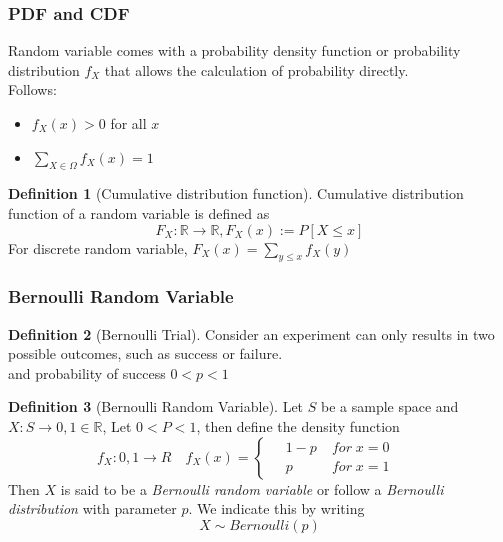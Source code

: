 \documentclass{article}
\theoremstyle{definition}
\newtheorem{definition}{Definition}[subsection]
\begin{document}
\subsubsection{PDF and CDF}
Random variable comes with a probability density function or probability distribution $f_X$ that allows the calculation of probability directly.\\
Follows:
\begin{itemize}
    \item $f_X(x)> 0$ for all $x$
    \item $\sum_{X\in \Omega} f_X(x)=1$ 
\end{itemize}
\begin{definition}[Cumulative distribution function]
    Cumulative distribution function of a random variable is defined as 
    \begin{equation}
        F_X:\mathbb{R}\rightarrow \mathbb{R}, F_X(x):=P[X\leq x]
    \end{equation}
    For discrete random variable, $F_X(x) = \sum_{y\leq x} f_X(y) $
\end{definition}
\subsubsection{Bernoulli Random Variable}
\begin{definition}[Bernoulli Trial]    
Consider an experiment can only results in two possible outcomes, such as success or failure.\\
and probability of success $0<p<1$
\end{definition}
\begin{definition}[Bernoulli Random Variable]
    Let $S$ be a sample space and $X:S\rightarrow {0,1}\in \mathbb{R}$, Let $0<P<1$, then define the density function
    \begin{equation}
        f_X:{0,1}\rightarrow R \quad f_X(x)=\left \{
            \begin{aligned}
                &\;1-p\; &for\; x=0\qquad \\
                &\;p  & for\;x=1\qquad
            \end{aligned}
            \right.
    \end{equation}
    Then $X$ is said to be a \emph{Bernoulli random variable} or follow a \emph{Bernoulli distribution} with parameter $p$.
    We indicate this by writing
    \begin{equation}
        X \sim Bernoulli(p)
    \end{equation}
\end{definition}
\end{document}
